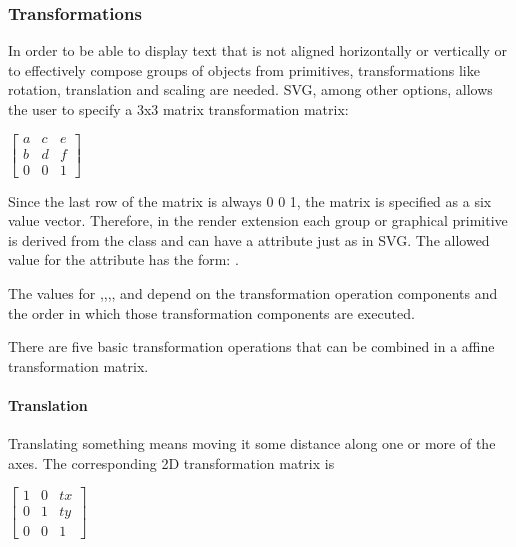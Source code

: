 \subsubsection{Transformations}
In order to be able to display text that is not aligned horizontally or 
vertically or to effectively compose groups of objects from primitives, 
transformations like rotation, translation and scaling are needed. SVG, among 
other options, allows the user to specify a 3x3 matrix transformation matrix: 

\hspace*{0.4cm}
\begin{center}
\begin{math}\left[ \begin{array}{ccc} a & c & e \\ b & d & f \\ 0 & 0 & 1\end{array}\right]\end{math}
\end{center}
\hspace*{0.4cm}

Since the last row of the matrix is always 0 0 1, the matrix is specified as a 
six value vector. Therefore, in the render extension each group or graphical 
primitive is derived from the class \TransformationTwoD and can have a  attribute just as in SVG. The allowed 
value for the attribute has the form: .

The values for ,,,, and  depend on the transformation operation components and the order in which those transformation components are executed.

There are five basic transformation operations that can be combined in a affine transformation matrix. 

\paragraph{Translation}
Translating something means moving it some distance along one or more of the axes. The corresponding 2D transformation matrix is

\hspace*{0.4cm}
\begin{center}
\begin{math}\left[ \begin{array}{ccc} 1 & 0 & tx \\ 0 & 1 & ty \\ 0 & 0 & 1\end{array}\right]\end{math}
\end{center}
\hspace*{0.4cm}

